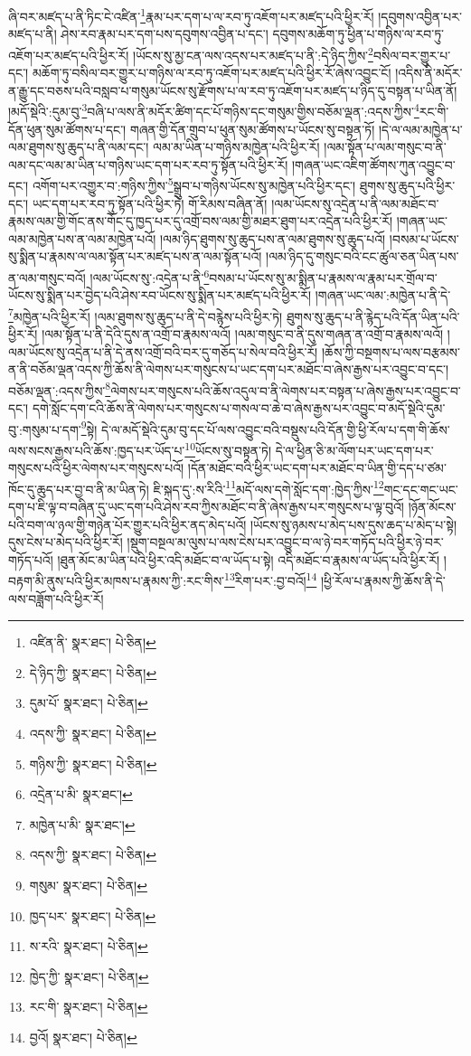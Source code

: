ཞི་བར་མཛད་པ་ནི་ཏིང་ངེ་འཛིན་\footnote{འཛིན་ནི་  སྣར་ཐང་།  པེ་ཅིན། }རྣམ་པར་དག་པ་ལ་རབ་ཏུ་འཇོག་པར་མཛད་པའི་ཕྱིར་རོ། །དབུགས་འབྱིན་པར་མཛད་པ་ནི། ཤེས་རབ་རྣམ་པར་དག་པས་དབུགས་འབྱིན་པ་དང་། དབུགས་མཆོག་ཏུ་ཕྱིན་པ་གཉིས་ལ་རབ་ཏུ་འཇོག་པར་མཛད་པའི་ཕྱིར་རོ། །ཡོངས་སུ་མྱ་ངན་ལས་འདས་པར་མཛད་པ་ནི་:དེ་ཉིད་ཀྱིས་\footnote{དེ་ཉིད་ཀྱི་  སྣར་ཐང་།  པེ་ཅིན། }བསིལ་བར་གྱུར་པ་དང་། མཆོག་ཏུ་བསིལ་བར་གྱུར་པ་གཉིས་ལ་རབ་ཏུ་འཇོག་པར་མཛད་པའི་ཕྱིར་རོ་ཞེས་འབྱུང་ངོ། །འདིས་ནི་མདོར་ན་རྒྱུ་དང་བཅས་པའི་བསླབ་པ་གསུམ་ཡོངས་སུ་རྫོགས་པ་ལ་རབ་ཏུ་འཇོག་པར་མཛད་པ་ཉིད་དུ་བསྟན་པ་ཡིན་ནོ། །མདོ་སྡེའི་:དུམ་བུ་\footnote{དུམ་པོ་  སྣར་ཐང་།  པེ་ཅིན། }བཞི་པ་ལས་ནི་མདོར་ཚིག་དང་པོ་གཉིས་དང་གསུམ་གྱིས་བཅོམ་ལྡན་:འདས་ཀྱིས་\footnote{འདས་ཀྱི་  སྣར་ཐང་།  པེ་ཅིན། }རང་གི་དོན་ཕུན་སུམ་ཚོགས་པ་དང་། གཞན་གྱི་དོན་གྲུབ་པ་ཕུན་སུམ་ཚོགས་པ་ཡོངས་སུ་བསྟན་ཏོ། །དེ་ལ་ལམ་མཁྱེན་པ་ལམ་ཐུགས་སུ་ཆུད་པ་ནི་ལམ་དང་། ལམ་མ་ཡིན་པ་གཉིས་མཁྱེན་པའི་ཕྱིར་རོ། །ལམ་སྟོན་པ་ལམ་གསུང་བ་ནི་ལམ་དང་ལམ་མ་ཡིན་པ་གཉིས་ཡང་དག་པར་རབ་ཏུ་སྟོན་པའི་ཕྱིར་རོ། །གཞན་ཡང་འཇིག་ཚོགས་ཀུན་འབྱུང་བ་དང་། འགོག་པར་འགྱུར་བ་:གཉིས་ཀྱིས་\footnote{གཉིས་ཀྱི་  སྣར་ཐང་།  པེ་ཅིན། }སྒྲུབ་པ་གཉིས་ཡོངས་སུ་མཁྱེན་པའི་ཕྱིར་དང་། ཐུགས་སུ་ཆུད་པའི་ཕྱིར་དང་། ཡང་དག་པར་རབ་ཏུ་སྟོན་པའི་ཕྱིར་ཏེ། གོ་རིམས་བཞིན་ནོ། །ལམ་ཡོངས་སུ་འདྲེན་པ་ནི་ལམ་མཐོང་བ་རྣམས་ལམ་གྱི་གོང་ནས་གོང་དུ་ཁྱད་པར་དུ་འགྲོ་བས་ལམ་གྱི་མཐར་ཐུག་པར་འདྲེན་པའི་ཕྱིར་རོ། །གཞན་ཡང་ལམ་མཁྱེན་པས་ན་ལམ་མཁྱེན་པའོ། །ལམ་ཉིད་ཐུགས་སུ་ཆུད་པས་ན་ལམ་ཐུགས་སུ་ཆུད་པའོ། །བསམ་པ་ཡོངས་སུ་སྨིན་པ་རྣམས་ལ་ལམ་སྟོན་པར་མཛད་པས་ན་ལམ་སྟོན་པའོ། །ལམ་ཉིད་དུ་གསུང་བའི་ངང་ཚུལ་ཅན་ཡིན་པས་ན་ལམ་གསུང་བའོ། །ལམ་ཡོངས་སུ་:འདྲེན་པ་ནི་\footnote{འདྲེན་པ་མི་  སྣར་ཐང་། }བསམ་པ་ཡོངས་སུ་མ་སྨིན་པ་རྣམས་ལ་རྣམ་པར་གྲོལ་བ་ཡོངས་སུ་སྨིན་པར་བྱེད་པའི་ཤེས་རབ་ཡོངས་སུ་སྨིན་པར་མཛད་པའི་ཕྱིར་རོ། །གཞན་ཡང་ལམ་:མཁྱེན་པ་ནི་དེ་\footnote{མཁྱེན་པ་མི་  སྣར་ཐང་། }མཁྱེན་པའི་ཕྱིར་རོ། །ལམ་ཐུགས་སུ་ཆུད་པ་ནི་དེ་བརྙེས་པའི་ཕྱིར་ཏེ། ཐུགས་སུ་ཆུད་པ་ནི་རྙེད་པའི་དོན་ཡིན་པའི་ཕྱིར་རོ། །ལམ་སྟོན་པ་ནི་དེའི་དུས་ན་འགྲོ་བ་རྣམས་ལའོ། །ལམ་གསུང་བ་ནི་དུས་གཞན་ན་འགྲོ་བ་རྣམས་ལའོ། །ལམ་ཡོངས་སུ་འདྲེན་པ་ནི་དེ་ནས་འགྲོ་བའི་བར་དུ་གཅོད་པ་སེལ་བའི་ཕྱིར་རོ། །ཆོས་ཀྱི་བསྔགས་པ་ལས་བརྩམས་ན་ནི་བཅོམ་ལྡན་འདས་ཀྱི་ཆོས་ནི་ལེགས་པར་གསུངས་པ་ཡང་དག་པར་མཐོང་བ་ཞེས་རྒྱས་པར་འབྱུང་བ་དང་། བཅོམ་ལྡན་:འདས་ཀྱིས་\footnote{འདས་ཀྱི་  སྣར་ཐང་།  པེ་ཅིན། }ལེགས་པར་གསུངས་པའི་ཆོས་འདུལ་བ་ནི་ལེགས་པར་བསྟན་པ་ཞེས་རྒྱས་པར་འབྱུང་བ་དང་། དགེ་སློང་དག་ངའི་ཆོས་ནི་ལེགས་པར་གསུངས་པ་གསལ་བ་ཆེ་བ་ཞེས་རྒྱས་པར་འབྱུང་བ་མདོ་སྡེའི་དུམ་བུ་:གསུམ་པ་དག་\footnote{གསུམ་  སྣར་ཐང་།  པེ་ཅིན། }སྟེ། དེ་ལ་མདོ་སྡེའི་དུམ་བུ་དང་པོ་ལས་འབྱུང་བའི་བསྡུས་པའི་དོན་གྱི་ཕྱི་རོལ་པ་དག་གི་ཆོས་ལས་སངས་རྒྱས་པའི་ཆོས་:ཁྱད་པར་ཡོད་པ་\footnote{ཁྱད་པར་  སྣར་ཐང་།  པེ་ཅིན། }ཡོངས་སུ་བསྟན་ཏེ། དེ་ལ་ཕྱིན་ཅི་མ་ལོག་པར་ཡང་དག་པར་གསུངས་པའི་ཕྱིར་ལེགས་པར་གསུངས་པའོ། །དོན་མཐོང་བའི་ཕྱིར་ཡང་དག་པར་མཐོང་བ་ཡིན་གྱི་དད་པ་ཙམ་ཁོང་དུ་ཆུད་པར་བྱ་བ་ནི་མ་ཡིན་ཏེ། ཇི་སྐད་དུ་:ས་རིའི་\footnote{ས་རའི་  སྣར་ཐང་།  པེ་ཅིན། }མདོ་ལས་དགེ་སློང་དག་:ཁྱེད་ཀྱིས་\footnote{ཁྱེད་ཀྱི་  སྣར་ཐང་།  པེ་ཅིན། }གང་དང་གང་ཡང་དག་པ་ཇི་ལྟ་བ་བཞིན་དུ་ཡང་དག་པའི་ཤེས་རབ་ཀྱིས་མཐོང་བ་ནི་ཞེས་རྒྱས་པར་གསུངས་པ་ལྟ་བུའོ། །ཉོན་མོངས་པའི་བག་ལ་ཉལ་གྱི་གཉེན་པོར་གྱུར་པའི་ཕྱིར་ནད་མེད་པའོ། །ཡོངས་སུ་ཉམས་པ་མེད་པས་དུས་ཆད་པ་མེད་པ་སྟེ། དུས་ངེས་པ་མེད་པའི་ཕྱིར་རོ། །སྡུག་བསྔལ་མ་ལུས་པ་ལས་ངེས་པར་འབྱུང་བ་ལ་ཉེ་བར་གཏོད་པའི་ཕྱིར་ཉེ་བར་གཏོད་པའོ། །ཐུན་མོང་མ་ཡིན་པའི་ཕྱིར་འདི་མཐོང་བ་ལ་ཡོད་པ་སྟེ། འདི་མཐོང་བ་རྣམས་ལ་ཡོད་པའི་ཕྱིར་རོ། །བརྟག་མི་ནུས་པའི་ཕྱིར་མཁས་པ་རྣམས་ཀྱི་:རང་གིས་\footnote{རང་གི་  སྣར་ཐང་།  པེ་ཅིན། }རིག་པར་:བྱ་བའོ།\footnote{བྱའོ།  སྣར་ཐང་།  པེ་ཅིན། } །ཕྱི་རོལ་པ་རྣམས་ཀྱི་ཆོས་ནི་དེ་ལས་བཟློག་པའི་ཕྱིར་རོ། 